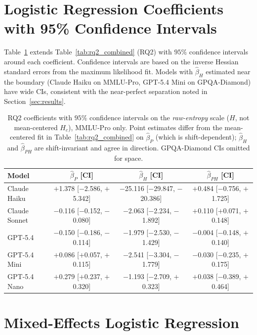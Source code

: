 \section{Logistic Regression Coefficients with 95\% Confidence Intervals}
\label{app:logreg_ci}

Table~\ref{tab:rq2_ci} extends Table~\ref{tab:rq2_combined} (RQ2) with $95\%$
confidence intervals around each coefficient. Confidence intervals
are based on the inverse Hessian standard errors from the maximum
likelihood fit. Models with $\hat\beta_H$ estimated near the boundary
(Claude Haiku on MMLU-Pro, GPT-5.4 Mini on GPQA-Diamond) have wide CIs,
consistent with the near-perfect separation noted in
Section~\ref{sec:results}.

\begin{table}[t]
\centering
\small
\setlength{\tabcolsep}{6pt}
\renewcommand{\arraystretch}{1.15}
\caption{RQ2 coefficients with $95\%$ confidence intervals on the
  \emph{raw-entropy} scale ($H$, not mean-centered $H_c$), MMLU-Pro only.
  Point estimates differ from the mean-centered fit in
  Table~\ref{tab:rq2_combined} on $\hat\beta_P$ (which is shift-dependent);
  $\hat\beta_H$ and $\hat\beta_{PH}$ are shift-invariant and agree in
  direction. GPQA-Diamond CIs omitted for space.}
\label{tab:rq2_ci}
\begin{tabular}{l ccc}
\toprule
\textbf{Model} & $\hat\beta_P$ [CI] & $\hat\beta_H$ [CI] & $\hat\beta_{PH}$ [CI] \\
\midrule
Claude Haiku  & $+$1.378 \tiny{[$-$2.586, $+$5.342]} & $-$25.116 \tiny{[$-$29.847, $-$20.386]} & $+$0.484 \tiny{[$-$0.756, $+$1.725]} \\
Claude Sonnet & $-$0.116 \tiny{[$-$0.152, $-$0.080]} & $-$2.063 \tiny{[$-$2.234, $-$1.892]}   & $+$0.110 \tiny{[$+$0.071, $+$0.148]} \\
GPT-5.4       & $-$0.150 \tiny{[$-$0.186, $-$0.114]} & $-$1.979 \tiny{[$-$2.530, $-$1.429]}   & $-$0.004 \tiny{[$-$0.148, $+$0.140]} \\
GPT-5.4 Mini  & $+$0.086 \tiny{[$+$0.057, $+$0.115]} & $-$2.541 \tiny{[$-$3.304, $-$1.779]}   & $-$0.030 \tiny{[$-$0.235, $+$0.175]} \\
GPT-5.4 Nano  & $+$0.279 \tiny{[$+$0.237, $+$0.320]} & $-$1.193 \tiny{[$-$2.709, $+$0.323]}   & $+$0.038 \tiny{[$-$0.389, $+$0.464]} \\
\bottomrule
\end{tabular}
\end{table}

\section{Mixed-Effects Logistic Regression}
\label{app:mixed_effects}

